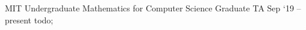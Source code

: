 \experience
    {MIT Undergraduate Mathematics for Computer Science}
    {Graduate TA}
    {Sep `19 -- present}
    {
        todo;
    }

